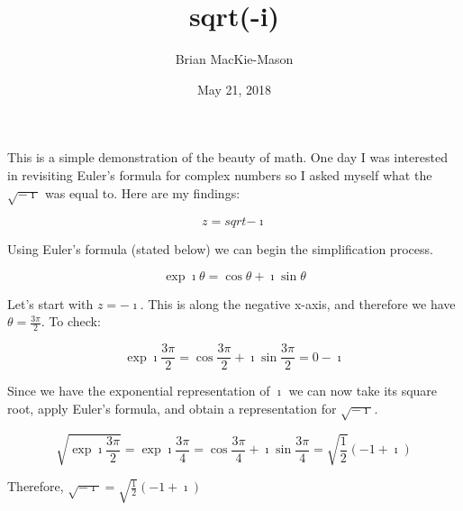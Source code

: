 \documentclass[12pt]{article}
\author{Brian MacKie-Mason}
\title{sqrt(-i)}
\date{May 21, 2018}
\begin{document}
\maketitle

This is a simple demonstration of the beauty of math. One day I was interested in revisiting Euler's formula for complex numbers so I asked myself what the $\sqrt{-\imath}$ was equal to. Here are my findings:

\begin{equation}
	z = sqrt{-\imath}
\end{equation}

Using Euler's formula (stated below) we can begin the simplification process.

\begin{equation}
	\exp{\imath \theta} = \cos{\theta} + \imath \sin{\theta}
\end{equation}

Let's start with $z = -\imath$. This is along the negative x-axis, and therefore we have $\theta = \frac{3 \pi}{2}$. To check:

\begin{equation}
	\exp{\imath \frac{3\pi}{2}} = \cos{\frac{3\pi}{2}} + \imath \sin{\frac{3\pi}{2}} = 0 - \imath
\end{equation}

Since we have the exponential representation of $\imath$ we can now take its square root, apply Euler's formula, and obtain a representation for $\sqrt{-\imath}$.

\begin{equation}
	\sqrt{\exp{\imath \frac{3\pi}{2}}} = \exp{\imath \frac{3\pi}{4}} = \cos{\frac{3\pi}{4}} + \imath \sin{\frac{3\pi}{4}} = \sqrt{\frac{1}{2}} \left( -1 + \imath \right)
\end{equation}

Therefore, $\sqrt{-\imath} = \sqrt{\frac{1}{2}} \left( -1 + \imath \right)$
\end{document}
